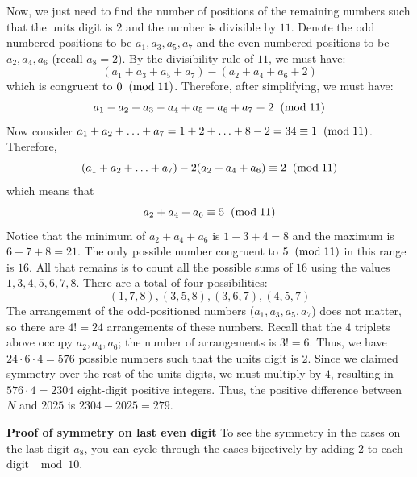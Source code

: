 \begin{enumerate}
 
Now, we just need to find the number of positions of the remaining numbers such that the units digit is $2$ and the number is divisible by $11$. Denote the odd numbered positions to be $a_1, a_3, a_5, a_7$ and the even numbered positions to be $a_2, a_4, a_6$ (recall $a_8=2$). By the divisibility rule of $11$, we must have:
 \[(a_1 + a_3 + a_5 + a_7) - (a_2 + a_4 + a_6 + 2)\]which is congruent to $0\hspace{2mm}(\text{mod}\hspace{1mm}11)$. Therefore, after simplifying, we must have:
 \[a_1 - a_2 + a_3 - a_4 + a_5 - a_6 + a_7\equiv2\hspace{2mm}(\text{mod}\hspace{1mm}11)\]Now consider $a_1+ a_2 +\ldots + a_7=1+2+\ldots+8-2=34\equiv1\hspace{2mm}(\text{mod}\hspace{1mm}11)$. Therefore,
 \[(a_1 + a_2 + \ldots+ a_7) - 2(a_2 + a_4 + a_6)\equiv2\hspace{2mm}(\text{mod}\hspace{1mm}11)\]which means that
 \[a_2 + a_4 + a_6\equiv5\hspace{2mm}(\text{mod}\hspace{1mm}11)\]Notice that the minimum of $a_2+a_4+a_6$ is $1 + 3 + 4 = 8$ and the maximum is $6 + 7 + 8 = 21$. The only possible number congruent to $5\hspace{2mm}(\text{mod}\hspace{1mm}11)$ in this range is $16$. All that remains is to count all the possible sums of $16$ using the values $1, 3, 4, 5, 6, 7, 8$. There are a total of four possibilities:
 \[(1, 7, 8), (3, 5, 8), (3, 6, 7), (4, 5, 7)\]The arrangement of the odd-positioned numbers ($a_1,a_3,a_5,a_7$) does not matter, so there are $4!=24$ arrangements of these numbers. Recall that the $4$ triplets above occupy $a_2,a_4,a_6$; the number of arrangements is $3!=6$. Thus, we have $24\cdot6\cdot4=576$ possible numbers such that the units digit is $2$. Since we claimed symmetry over the rest of the units digits, we must multiply by $4$, resulting in $576\cdot4=2304$ eight-digit positive integers. Thus, the positive difference between $N$ and $2025$ is $2304 - 2025 = \boxed{279}$.

 \textbf{Proof of symmetry on last even digit} To see the symmetry in the cases on the last digit $a_8$, you can cycle through the cases bijectively by adding 2 to each digit $\mod 10$.

 




\end{enumerate}
